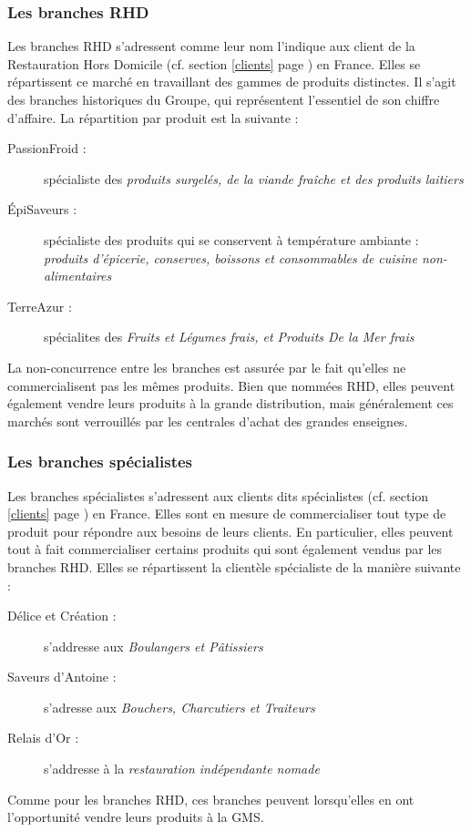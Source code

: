                 \subsubsection{Les branches RHD}
                
                Les branches RHD s'adressent comme leur nom l'indique aux client de la Restauration Hors Domicile (cf. section \ref{clients} page \pageref{clients}) en France.
                Elles se répartissent ce marché en travaillant des gammes de produits distinctes.
                Il s'agit des branches historiques du Groupe, qui représentent l'essentiel de son chiffre d'affaire.
                La répartition par produit est la suivante :
                \begin{description}
                    \item[PassionFroid :] spécialiste des \emph{produits surgelés, de la viande fraîche et des produits laitiers}
                    \item[\'{E}piSaveurs :] spécialiste des produits qui se conservent à température ambiante : \emph{produits d'épicerie, conserves, boissons et consommables de cuisine non-alimentaires}
                    \item[TerreAzur :] spécialites des \emph{Fruits et Légumes frais, et Produits De la Mer frais} 
                \end{description}
                La non-concurrence entre les branches est assurée par le fait qu'elles ne commercialisent pas les mêmes produits.
                Bien que nommées RHD, elles peuvent également vendre leurs produits à la grande distribution, mais généralement ces marchés sont verrouillés par les centrales d'achat des grandes enseignes.

                \subsubsection{Les branches spécialistes}

                Les branches spécialistes s'adressent aux clients dits spécialistes (cf. section \ref{clients} page \pageref{clients}) en France.
                Elles sont en mesure de commercialiser tout type de produit pour répondre aux besoins de leurs clients.
                En particulier, elles peuvent tout à fait commercialiser certains produits qui sont également vendus par les branches RHD.
                Elles se répartissent la clientèle spécialiste de la manière suivante :
                \begin{description}
                    \item[Délice et Création :] s'addresse aux \emph{Boulangers et Pâtissiers}
                    \item[Saveurs d'Antoine :] s'adresse aux \emph{Bouchers, Charcutiers et Traiteurs}
                    \item[Relais d'Or :] s'addresse à la \emph{restauration indépendante nomade}
                \end{description}
                Comme pour les branches RHD, ces branches peuvent lorsqu'elles en ont l'opportunité vendre leurs produits à la GMS.

